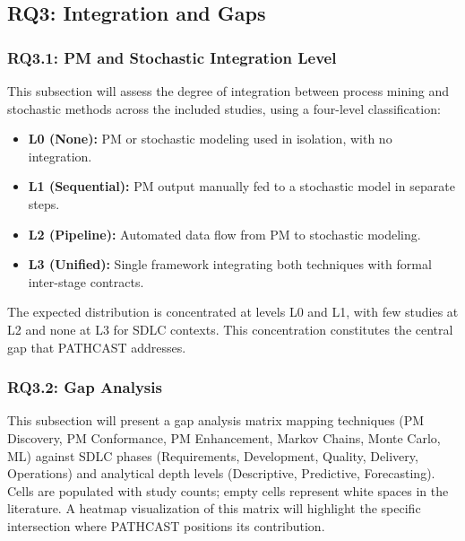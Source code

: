 \subsection{RQ3: Integration and Gaps}
\label{sec:slr-rq3}

\subsubsection{RQ3.1: PM and Stochastic Integration Level}


This subsection will assess the degree of integration between process mining and stochastic methods across the included studies, using a four-level classification:

\begin{itemize}
\item \textbf{L0 (None):} PM or stochastic modeling used in isolation, with no integration.
\item \textbf{L1 (Sequential):} PM output manually fed to a stochastic model in separate steps.
\item \textbf{L2 (Pipeline):} Automated data flow from PM to stochastic modeling.
\item \textbf{L3 (Unified):} Single framework integrating both techniques with formal inter-stage contracts.
\end{itemize}

The expected distribution is concentrated at levels L0 and L1, with few studies at L2 and none at L3 for SDLC contexts. This concentration constitutes the central gap that PATHCAST addresses.

\subsubsection{RQ3.2: Gap Analysis}


This subsection will present a gap analysis matrix mapping techniques (PM Discovery, PM Conformance, PM Enhancement, Markov Chains, Monte Carlo, ML) against SDLC phases (Requirements, Development, Quality, Delivery, Operations) and analytical depth levels (Descriptive, Predictive, Forecasting). Cells are populated with study counts; empty cells represent white spaces in the literature. A heatmap visualization of this matrix will highlight the specific intersection where PATHCAST positions its contribution.


